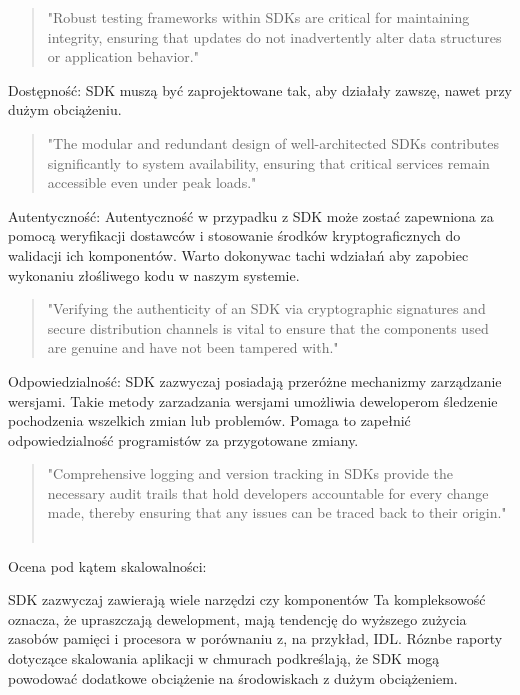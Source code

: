 \documentclass[runningheads,12pt]{llncs}
\begin{document}
\begin{quote}
    "Robust testing frameworks within SDKs are critical for maintaining integrity, ensuring that updates do not inadvertently alter data structures or application behavior." ~\cite[para 5]{azure2020}
\end{quote}

Dostępność: SDK muszą być zaprojektowane tak, aby działały zawszę, nawet przy dużym obciążeniu. 

\begin{quote}
    "The modular and redundant design of well-architected SDKs contributes significantly to system availability, ensuring that critical services remain accessible even under peak loads." ~\cite[para 6]{azure2020}
\end{quote}

Autentyczność: Autentyczność w przypadku z SDK może zostać zapewniona za pomocą weryfikacji dostawców i stosowanie środków kryptograficznych do walidacji ich komponentów. Warto dokonywac tachi wdziałań aby zapobiec wykonaniu złośliwego kodu w naszym systemie.

\begin{quote}
    "Verifying the authenticity of an SDK via cryptographic signatures and secure distribution channels is vital to ensure that the components used are genuine and have not been tampered with." ~\cite[para 7]{azure2020}
\end{quote}

Odpowiedzialność: SDK zazwyczaj posiadają przeróżne mechanizmy zarządzanie wersjami. Takie metody zarzadzania wersjami umożliwia deweloperom śledzenie pochodzenia wszelkich zmian lub problemów. Pomaga to zapełnić odpowiedzialność programistów za przygotowane zmiany.

\begin{quote}
    "Comprehensive logging and version tracking in SDKs provide the necessary audit trails that hold developers accountable for every change made, thereby ensuring that any issues can be traced back to their origin." ~\cite[para 7]{azure2020}
\end{quote}

Ocena pod kątem skalowalności:

SDK zazwyczaj zawierają wiele narzędzi czy komponentów Ta kompleksowość oznacza, że upraszczają dewelopment, mają tendencję do wyższego zużycia zasobów pamięci i procesora w porównaniu z, na przykład, IDL. Róznbe raporty dotyczące skalowania aplikacji w chmurach podkreślają, że SDK mogą powodować dodatkowe obciążenie na środowiskach z dużym obciążeniem.
\end{document}
